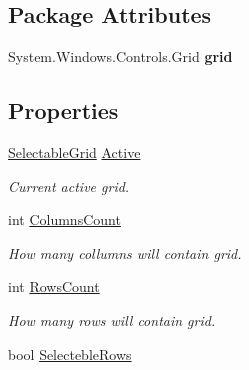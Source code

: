 \subsection*{Package Attributes}
\begin{DoxyCompactItemize}
\item 
\mbox{\label{class_wpf_handler_1_1_u_i_1_1_controls_1_1_selectable_grid_afdce270b7d04bf8f7143d56e7bc77602}} 
System.\+Windows.\+Controls.\+Grid {\bfseries grid}
\end{DoxyCompactItemize}
\subsection*{Properties}
\begin{DoxyCompactItemize}
\item 
\mbox{\hyperlink{class_wpf_handler_1_1_u_i_1_1_controls_1_1_selectable_grid}{Selectable\+Grid}} \mbox{\hyperlink{class_wpf_handler_1_1_u_i_1_1_controls_1_1_selectable_grid_ae199a4309937de8ff5ba0e5810c46c60}{Active}}
\begin{DoxyCompactList}\small\item\em Current active grid. \end{DoxyCompactList}\item 
int \mbox{\hyperlink{class_wpf_handler_1_1_u_i_1_1_controls_1_1_selectable_grid_ad2776d9cb89fc0728452c45b3301cca6}{Columns\+Count}}
\begin{DoxyCompactList}\small\item\em How many collumns will contain grid. \end{DoxyCompactList}\item 
int \mbox{\hyperlink{class_wpf_handler_1_1_u_i_1_1_controls_1_1_selectable_grid_ab4175e918c62be3413dbeae09d3d89b6}{Rows\+Count}}
\begin{DoxyCompactList}\small\item\em How many rows will contain grid. \end{DoxyCompactList}\item 
bool \mbox{\hyperlink{class_wpf_handler_1_1_u_i_1_1_controls_1_1_selectable_grid_a868b098a54c06eeb57cfce7d19f042c7}{Selecteble\+Rows}}

\end{DoxyCompactItemize}
